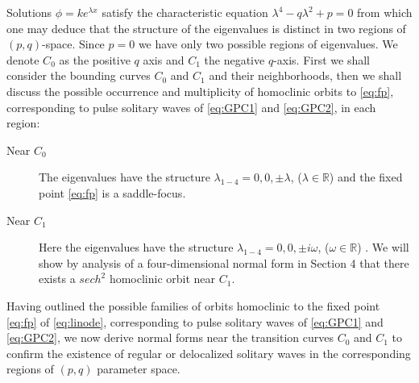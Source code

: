 Solutions $\phi = k e^{\lambda x}$ satisfy the characteristic equation
$\lambda^4 - q \lambda^2 + p = 0 $ from which one may deduce that the structure
of the eigenvalues is distinct in two regions of $\left(p,q\right)$-space.
Since $p=0$ we have only two possible regions of eigenvalues.  We denote $C_0$
as the positive $q$ axis and $C_1$ the negative $q$-axis. First we shall 
consider the bounding curves $C_0$ and $C_1$ and their neighborhoods, then we shall discuss the possible
occurrence and multiplicity of homoclinic orbits to \eqref{eq:fp}, corresponding
to pulse solitary waves of \eqref{eq:GPC1} and \eqref{eq:GPC2}, in each region:

\begin{description}
\item[Near $C_0$] 
The eigenvalues have the structure $\lambda_{1-4} = 0,0,\pm \lambda$, ($\lambda \in \mathbb{R}$) and the fixed point
\eqref{eq:fp} is a saddle-focus.
\item[Near $C_1$] 
Here the eigenvalues have the structure $\lambda_{1-4} = 0,0,\pm i \omega $, ($\omega \in \mathbb{R}$) . We will show by analysis of a
four-dimensional normal form in Section 4 that there exists a $sech^2$ homoclinic orbit near $C_1$.
\end{description}

Having outlined the possible families of orbits homoclinic to the fixed point \eqref{eq:fp} of \eqref{eq:linode},
corresponding to pulse solitary waves of \eqref{eq:GPC1} and \eqref{eq:GPC2}, we now derive normal forms near the transition curves $C_0$ and $C_1$
to confirm the existence of regular or delocalized solitary waves in the corresponding regions of $\left(p,q\right)$ parameter space.

